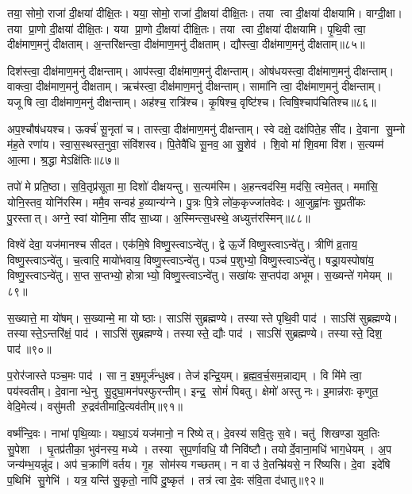 तया॒ सोमो॒ राजा॑ दी॒क्षया॑ दीक्षि॒तः।
यया॒ सोमो॒ राजा॑ दी॒क्षया॑ दीक्षि॒तः।
तया त्वा दी॒क्षया॑ दीक्षयामि।
वाग्दी॒क्षा।
तया प्रा॒णो दी॒क्षया॑ दीक्षि॒तः।
यया प्रा॒णो दी॒क्षया॑ दीक्षि॒तः।
तया त्वा दी॒क्षया॑ दीक्षयामि।
पृ॒थि॒वी त्वा॒ दीक्ष॑माण॒मनु॑ दीक्षताम्।
अ॒न्तरि॑क्षन्त्वा॒ दीक्ष॑माण॒मनु॑ दीक्षताम्।
द्यौस्त्वा॒ दीक्ष॑माण॒मनु॑ दीक्षताम्॥८५॥

दिश॑स्त्वा॒ दीक्ष॑माण॒मनु॑ दीक्षन्ताम्।
आप॑स्त्वा॒ दीक्ष॑माण॒मनु॑ दीक्षन्ताम्।
ओष॑धयस्त्वा॒ दीक्ष॑माण॒मनु॑ दीक्षन्ताम्।
वाक्त्वा॒ दीक्ष॑माण॒मनु॑ दीक्षताम्।
ऋच॑स्त्वा॒ दीक्ष॑माण॒मनु॑ दीक्षन्ताम्।
सामा॑नि त्वा॒ दीक्ष॑माण॒मनु॑ दीक्षन्ताम्।
यजूषि त्वा॒ दीक्ष॑माण॒मनु॑ दीक्षन्ताम्।
अह॑श्च॒ रात्रि॑श्च।
कृ॒षिश्च॒ वृष्टि॑श्च।
त्विषि॒श्चाप॑चितिश्च॥८६॥

अप॒श्चौष॑धयश्च।
ऊर्क्च॑ सू॒नृता॑ च।
तास्त्वा॒ दीक्ष॑माण॒मनु॑ दीक्षन्ताम्।
स्वे दक्षे॒ दक्ष॑पिते॒ह सी॑द।
दे॒वाना सु॒म्नो म॑ह॒ते रणा॑य।
स्वा॒स॒स्थस्त॒नुवा॒ संवि॑शस्व।
पि॒तेवै॑धि सू॒नव॒ आ सु॒शेव॑।
शि॒वो मा॑ शि॒वमा वि॑श।
स॒त्यम्म॑ आ॒त्मा।
श्र॒द्धा मेऽक्षि॑तिः॥८७॥

तपो॑ मे प्रति॒ष्ठा।
स॒वि॒तृप्र॑सूता मा॒ दिशो॑ दीक्षयन्तु।
स॒त्यम॑स्मि।
अ॒हन्त्वद॑स्मि॒ मद॑सि॒ त्वमे॒तत्।
ममा॑सि॒ योनि॒स्तव॒ योनि॑रस्मि।
ममै॒व सन्वह॑ ह॒व्यान्य॑ग्ने।
पु॒त्रः पि॒त्रे लो॑क॒कृज्जा॑तवेदः।
आ॒जुह्वा॑नः सु॒प्रती॑कः पु॒रस्तात्।
अग्ने॒ स्वां योनि॒मा सी॑द सा॒ध्या।
अ॒स्मिन्त्स॒धस्थे॒ अध्युत्त॑रस्मिन्॥८८॥

विश्वे॑ देवा॒ यज॑मानश्च सीदत।
एक॑मि॒षे विष्णु॒स्त्वाऽन्वे॑तु।
द्वे ऊ॒र्जे विष्णु॒स्त्वाऽन्वे॑तु।
त्रीणि॑ व्र॒ताय॒ विष्णु॒स्त्वाऽन्वे॑तु।
च॒त्वारि॒ मायो॑भवाय॒ विष्णु॒स्त्वाऽन्वे॑तु।
पञ्च॑ प॒शुभ्यो॒ विष्णु॒स्त्वाऽन्वे॑तु।
षड्रा॒यस्पोषा॑य॒ विष्णु॒स्त्वाऽन्वे॑तु।
स॒प्त स॒प्तभ्यो॒ होत्राभ्यो॒ विष्णु॒स्त्वाऽन्वे॑तु।
सखा॑यः स॒प्तप॑दा अभूम।
स॒ख्यन्ते॑ गमेयम् ॥८९॥

स॒ख्यात्ते॒ मा यो॑षम्।
स॒ख्यान्मे॒ मा योष्ठाः।
साऽसि॑ सुब्रह्मण्ये।
तस्यास्ते पृथि॒वी पाद॑।
साऽसि॑ सुब्रह्मण्ये।
तस्यास्ते॒ऽन्तरि॑क्षं॒ पाद॑।
साऽसि॑ सुब्रह्मण्ये।
तस्यास्ते॒ द्यौः पाद॑।
साऽसि॑ सुब्रह्मण्ये।
तस्यास्ते॒ दिश॒ पाद॑॥९०॥

प॒रोर॑जास्ते पञ्च॒मः पाद॑।
सा न॒ इष॒मूर्ज॑न्धुक्ष्व।
तेज॑ इन्द्रि॒यम्।
ब्र॒ह्म॒व॒र्च॒सम॒न्नाद्यम्।
वि मि॑मे त्वा॒ पय॑स्वतीम्।
दे॒वानान्धे॒नु सु॒दुघा॒मन॑पस्फुरन्तीम्।
इन्द्र॒ सोमं॑ पिबतु।
क्षेमो॑ अस्तु नः।
इ॒मान्न॑राः कृणुत॒ वेदि॒मेत्य॑।
वसु॑मती रु॒द्रव॑तीमादि॒त्यव॑तीम्॥९१॥

वर्ष्म॑न्दि॒वः।
नाभा॑ पृथि॒व्याः।
यथा॒ऽयं यज॑मानो॒ न रिष्येत्।
दे॒वस्य॑ सवि॒तुः स॒वे।
चतु॑ शिखण्डा युव॒तिः सु॒पेशा।
घृ॒तप्र॑तीका॒ भुव॑नस्य॒ मध्ये।
तस्या सुप॒र्णावधि॒ यौ निवि॑ष्टौ।
तयोर्दे॒वाना॒मधि॑ भाग॒धेयम्।
अ॒प जन्य॑म्भ॒यन्नु॑द।
अप॑ च॒क्राणि॑ वर्तय।
गृ॒ह सोम॑स्य गच्छतम्।
न वा उ॑ वे॒तन्म्रि॑यसे॒ न रि॑ष्यसि।
दे॒वा इदे॑षि प॒थिभि॑ सु॒गेभि॑।
यत्र॒ यन्ति॑ सु॒कृतो॒ नापि॑ दु॒ष्कृत॑।
तत्र॑ त्वा दे॒वः स॑वि॒ता द॑धातु॥९२॥\anuvakamend[ब्रह्म॑णो॒ योनि॒रह॑सः प॒ङ्क्तिं प्रप॑द्ये दी॒क्षा यया॑ऽऽदि॒त्यो दी॒क्षया॑ दीक्षि॒तस्तया त्वा दी॒क्षया॑ दीक्षया॒म्योष॑धयो दी॒क्षा द्यौस्त्वा॒ दीक्ष॑माण॒मनु॑ दीक्षता॒मप॑चिति॒श्चाक्षि॑ति॒रुत्त॑रस्मिन्गमेयं॒ दिश॒ पाद॑ आदि॒त्यव॑तीं वर्तय॒ पञ्च॑ च]

